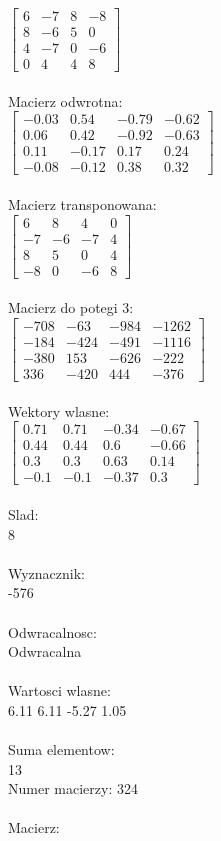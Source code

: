 \documentclass[a4paper,12pt]{article}
\begin{document}
$\begin{bmatrix} 6&-7&8&-8\\8&-6&5&0\\4&-7&0&-6\\0&4&4&8 \end{bmatrix}$
\\
\\
Macierz odwrotna:\\

$\begin{bmatrix} -0.03&0.54&-0.79&-0.62\\0.06&0.42&-0.92&-0.63\\0.11&-0.17&0.17&0.24\\-0.08&-0.12&0.38&0.32 \end{bmatrix}$
\\
\\
Macierz transponowana:\\

$\begin{bmatrix} 6&8&4&0\\-7&-6&-7&4\\8&5&0&4\\-8&0&-6&8 \end{bmatrix}$
\\
\\
Macierz do potegi 3:\\

$\begin{bmatrix} -708&-63&-984&-1262\\-184&-424&-491&-1116\\-380&153&-626&-222\\336&-420&444&-376 \end{bmatrix}$
\\
\\
Wektory wlasne:\\

$\begin{bmatrix} 0.71&0.71&-0.34&-0.67\\0.44&0.44&0.6&-0.66\\0.3&0.3&0.63&0.14\\-0.1&-0.1&-0.37&0.3 \end{bmatrix}$
\\
\\
Slad:\\
8
\\
\\
Wyznacznik:\\
-576
\\
\\
Odwracalnosc:\\
Odwracalna
\\
\\
Wartosci wlasne:\\
6.11 6.11 -5.27 1.05
\\
\\
Suma elementow:\\
13
\\
\newpage
Numer macierzy:
324
\\
\\
Macierz:\\
\end{document}
